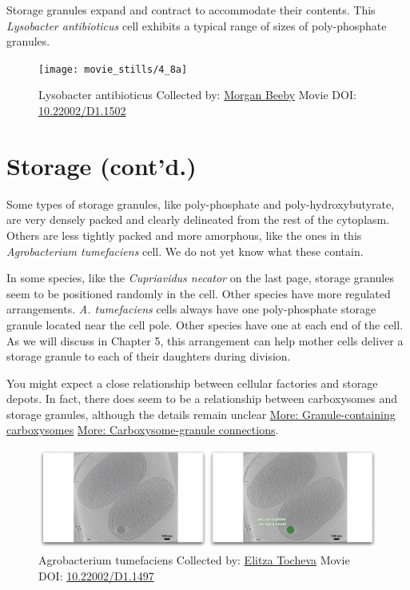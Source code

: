 \documentclass[]{tufte-book}
\begin{document}
Storage granules expand and contract to accommodate their contents. This
\emph{Lysobacter antibioticus} cell exhibits a typical range of sizes of
poly-phosphate granules.





\begin{figure}
\texttt{[image: movie\_stills/4\_8a]} \caption[Lysobacter antibioticus Collected by:
\protect\hyperlink{morgan_beeby}{Morgan Beeby} Movie DOI:
\href{https://doi.org/10.22002/D1.1502}{10.22002/D1.1502}]{Lysobacter antibioticus Collected by:
\protect\hyperlink{morgan_beeby}{Morgan Beeby} Movie DOI:
\href{https://doi.org/10.22002/D1.1502}{10.22002/D1.1502}}\label{fig:4-8a}
\end{figure}

\section{Storage (cont'd.)}\label{storage-contd.}

Some types of storage granules, like poly-phosphate and
poly-hydroxybutyrate, are very densely packed and clearly delineated
from the rest of the cytoplasm. Others are less tightly packed and more
amorphous, like the ones in this \emph{Agrobacterium tumefaciens} cell.
We do not yet know what these contain.

In some species, like the \emph{Cupriavidus necator} on the last page,
storage granules seem to be positioned randomly in the cell. Other
species have more regulated arrangements. \emph{A. tumefaciens} cells
always have one poly-phosphate storage granule located near the cell
pole. Other species have one at each end of the cell. As we will discuss
in Chapter 5, this arrangement can help mother cells deliver a storage
granule to each of their daughters during division.

You might expect a close relationship between cellular factories and
storage depots. In fact, there does seem to be a relationship between
carboxysomes and storage granules, although the details remain unclear
\protect\hyperlink{Granule-containing_carboxysomes}{More:
Granule-containing carboxysomes}
\protect\hyperlink{Carboxysome-granule_connections}{More:
Carboxysome-granule connections}.





\begin{figure}
\includegraphics{movie_stills/4_9} \caption[Agrobacterium tumefaciens Collected by:
\protect\hyperlink{elitza_tocheva}{Elitza Tocheva} Movie DOI:
\href{https://doi.org/10.22002/D1.1497}{10.22002/D1.1497}]{Agrobacterium tumefaciens Collected by:
\protect\hyperlink{elitza_tocheva}{Elitza Tocheva} Movie DOI:
\href{https://doi.org/10.22002/D1.1497}{10.22002/D1.1497}}\label{fig:4-9}
\end{figure}
\end{document}
